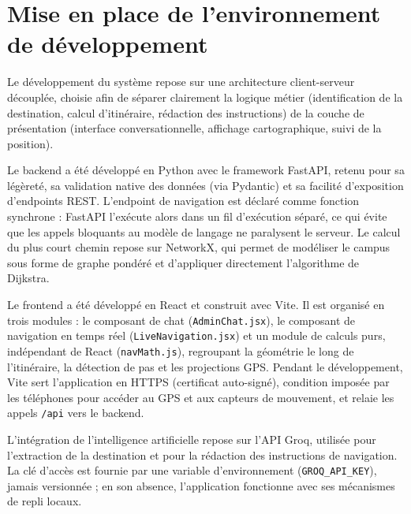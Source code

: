 \documentclass[12pt,a4paper]{report}
\begin{document}
\section{Mise en place de l'environnement de développement}

Le développement du système repose sur une architecture client-serveur découplée, choisie afin de
séparer clairement la logique métier (identification de la destination, calcul d'itinéraire,
rédaction des instructions) de la couche de présentation (interface conversationnelle, affichage
cartographique, suivi de la position).

Le backend a été développé en Python avec le framework FastAPI, retenu pour sa légèreté, sa
validation native des données (via Pydantic) et sa facilité d'exposition d'endpoints REST.
L'endpoint de navigation est déclaré comme fonction synchrone : FastAPI l'exécute alors dans un
fil d'exécution séparé, ce qui évite que les appels bloquants au modèle de langage ne paralysent
le serveur. Le calcul du plus court chemin repose sur NetworkX, qui permet de modéliser le campus
sous forme de graphe pondéré et d'appliquer directement l'algorithme de Dijkstra.

Le frontend a été développé en React et construit avec Vite. Il est organisé en trois modules : le
composant de chat (\texttt{AdminChat.jsx}), le composant de navigation en temps réel
(\texttt{LiveNavigation.jsx}) et un module de calculs purs, indépendant de React
(\texttt{navMath.js}), regroupant la géométrie le long de l'itinéraire, la détection de pas et les
projections GPS. Pendant le développement, Vite sert l'application en HTTPS (certificat
auto-signé), condition imposée par les téléphones pour accéder au GPS et aux capteurs de
mouvement, et relaie les appels \texttt{/api} vers le backend.

L'intégration de l'intelligence artificielle repose sur l'API Groq, utilisée pour l'extraction de
la destination et pour la rédaction des instructions de navigation. La clé d'accès est fournie par
une variable d'environnement (\texttt{GROQ\_API\_KEY}), jamais versionnée ; en son absence,
l'application fonctionne avec ses mécanismes de repli locaux.
\end{document}
